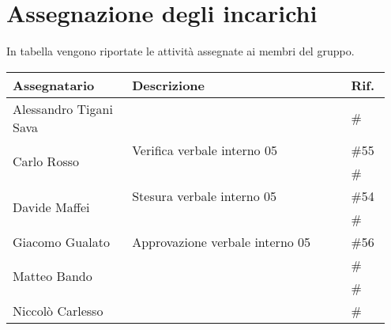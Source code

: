 \section{Assegnazione degli incarichi}
In tabella vengono riportate le attività assegnate ai membri del gruppo.
\begin{center}
    {
    \renewcommand{\arraystretch}{1.5}
    \begin{tabular}{p{0.30\linewidth}|p{0.55\linewidth}|p{0.10\linewidth}}
		\textbf{Assegnatario}   		&   \textbf{Descrizione}   & \textbf{Rif.}     \\
		\hline
		Alessandro Tigani Sava  		&	& \# 	\\
		\hline
		\multirow{2}{*}{Carlo Rosso}	& Verifica verbale interno 05		& \#55 	\\
		\cline{2-3}
										&	& \# 	\\
		\hline
		\multirow{2}{*}{Davide Maffei}	& Stesura verbale interno 05		& \#54 	\\
		\cline{2-3}
										&	& \# 	\\
		\hline
		Giacomo Gualato					& Approvazione verbale interno 05	& \#56 	\\
		\hline
		\multirow{2}{*}{Matteo Bando}	&	& \# 	\\
		\cline{2-3}
										& 	& \# 	\\
		\hline
		Niccolò Carlesso				&	& \# 	\\
    \end{tabular}
    }
\end{center}
